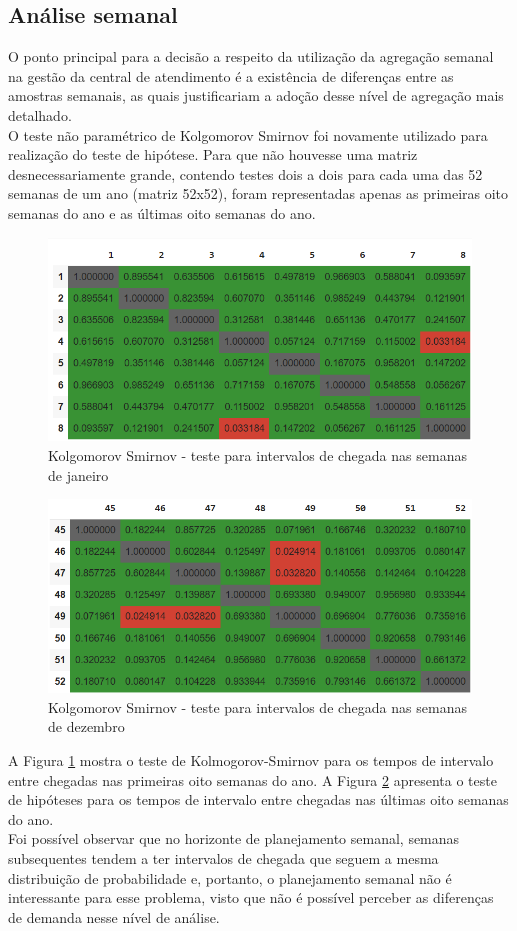 \subsection{Análise semanal}
O ponto principal para a decisão a respeito da utilização da agregação semanal na gestão da central de atendimento é a existência de diferenças entre as amostras semanais, as quais justificariam a adoção desse nível de agregação mais detalhado.\\
O teste não paramétrico de Kolgomorov Smirnov foi novamente utilizado para realização do teste de hipótese. Para que não houvesse uma matriz desnecessariamente grande, contendo testes dois a dois para cada uma das 52 semanas de um ano (matriz 52x52), foram representadas apenas as primeiras oito semanas do ano e as últimas oito semanas do ano.

\begin{figure}[H]
    \includegraphics{analise-de-dados/semanal/janas.png}
    \caption{Kolgomorov Smirnov - teste para intervalos de chegada nas semanas de janeiro}
    \label{fig: jan_as_img}
\end{figure}

\begin{figure}[H]
    \includegraphics{analise-de-dados/semanal/dezas.png}
    \caption{Kolgomorov Smirnov - teste para intervalos de chegada nas semanas de dezembro}
    \label{fig: dez_as_img}
\end{figure}

A Figura \ref*{fig: jan_as_img} mostra o teste de Kolmogorov-Smirnov para os tempos de intervalo entre chegadas nas primeiras oito semanas do ano. A Figura \ref*{fig: dez_as_img} apresenta o teste de hipóteses para os tempos de intervalo entre chegadas nas últimas oito semanas do ano.\\
Foi possível observar que no horizonte de planejamento semanal, semanas subsequentes tendem a ter intervalos de chegada que seguem a mesma distribuição de probabilidade e, portanto, o planejamento semanal não é interessante para esse problema, visto que não é possível perceber as diferenças de demanda nesse nível de análise.